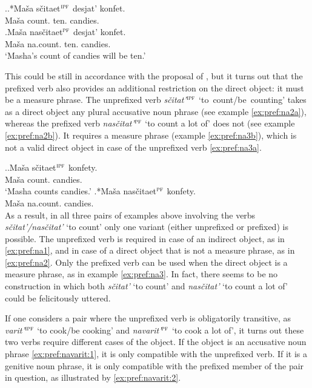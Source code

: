 \ex.\label{ex:pref:na2}\ag.*Ma\v{s}a s\v{c}itaet$^{\textsc{ipf}}$ desjat' konfet.\label{ex:pref:na2a}\\
Ma\v{s}a count. ten. candies.\\
\bg.\label{ex:pref:na2b}Ma\v{s}a nas\v{c}itaet$^{\textsc{pf}}$ desjat' konfet.\\
Ma\v{s}a na.count. ten. candies.\\
\trans `Masha's count of candies will be ten.'

This could be still in accordance with the proposal of \citet{Tatevosov:09}, but it turns out that the prefixed verb also provides an additional restriction on the direct object: it must be a measure phrase. The unprefixed verb \textit{s\v{c}itat'}$^{\textsc{ipf}}$ \mbox{`to count/be counting'} takes as a direct object any plural accusative noun phrase (see example \ref{ex:pref:na2a}), whereas the prefixed verb \textit{nas\v{c}itat'}$^{\textsc{pf}}$ `to count a lot of' does not (see example \ref{ex:pref:na2b}). It requires a measure phrase (example \ref{ex:pref:na3b}), which is not a valid direct object in case of the unprefixed verb \ref{ex:pref:na3a}. 

\ex.\label{ex:pref:na3}\ag.\label{ex:pref:na3a}Ma\v{s}a s\v{c}itaet$^{\textsc{ipf}}$ konfety.\\
Ma\v{s}a count. candies.\\
\trans `Masha counts candies.'
\bg.*Ma\v{s}a nas\v{c}itaet$^{\textsc{pf}}$ konfety.\label{ex:pref:na3b}\\
Ma\v{s}a na.count. candies.\\

As a result, in all three pairs of examples above involving the verbs \textit{s\v{c}itat'/nas\v{c}itat'} `to count' only one variant (either unprefixed or prefixed) is possible. The unprefixed verb is required in case of an indirect object, as in \ref{ex:pref:na1}, and in case of a direct object that is not a measure phrase, as in \ref{ex:pref:na2}. Only the prefixed verb can be used when the direct object is a measure phrase, as in example \ref{ex:pref:na3}. In fact, there seems to be no construction in which both \textit{s\v{c}itat'} `to count' and \textit{nas\v{c}itat'} `to count a lot of' could be felicitously uttered.

If one considers a pair where the unprefixed verb is obligatorily transitive, as \textit{varit'}$^{\textsc{ipf}}$ `to cook/be cooking' and \textit{navarit'}$^{\textsc{pf}}$ `to cook a lot of', it turns out these two verbs require different cases of the object. If the object is an accusative noun phrase \ref{ex:pref:navarit:1}, it is only compatible with the unprefixed verb. If it is a genitive noun phrase, it is only compatible with the prefixed member of the pair in question, as illustrated by \ref{ex:pref:navarit:2}.

